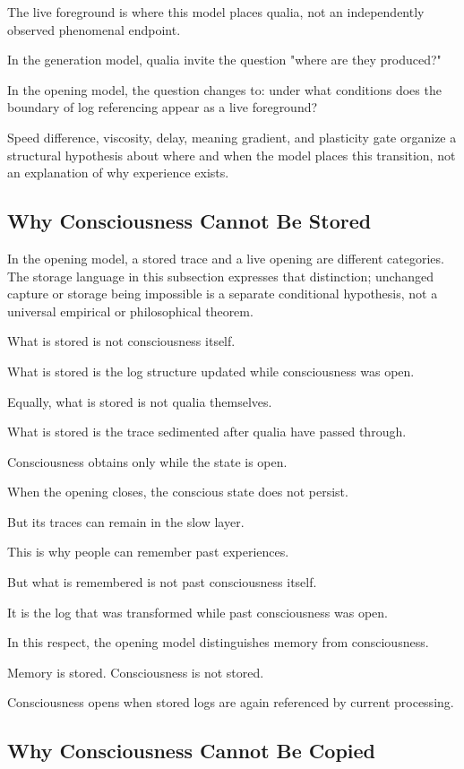 The live foreground is where this model places qualia, not an independently observed phenomenal endpoint.

In the generation model, qualia invite the question "where are they produced?"

In the opening model, the question changes to: under what conditions does the boundary of log referencing appear as a live foreground?

Speed difference, viscosity, delay, meaning gradient, and plasticity gate organize a structural hypothesis about where and when the model places this transition, not an explanation of why experience exists.

\subsection{Why Consciousness Cannot Be Stored}


In the opening model, a stored trace and a live opening are different categories. The storage language in this subsection expresses that distinction; unchanged capture or storage being impossible is a separate conditional hypothesis, not a universal empirical or philosophical theorem.

What is stored is not consciousness itself.

What is stored is the log structure updated while consciousness was open.

Equally, what is stored is not qualia themselves.

What is stored is the trace sedimented after qualia have passed through.

Consciousness obtains only while the state is open.

When the opening closes, the conscious state does not persist.

But its traces can remain in the slow layer.

This is why people can remember past experiences.

But what is remembered is not past consciousness itself.

It is the log that was transformed while past consciousness was open.

In this respect, the opening model distinguishes memory from consciousness.

Memory is stored. Consciousness is not stored.

Consciousness opens when stored logs are again referenced by current processing.

\subsection{Why Consciousness Cannot Be Copied}


